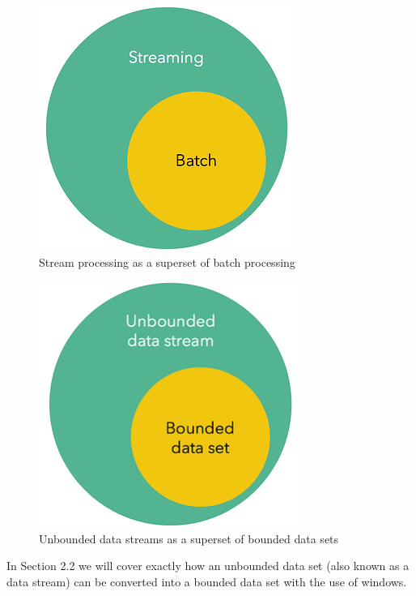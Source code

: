 \begin{figure}[!htb]
    \begin{center}
      \includegraphics[scale=0.5]{figures/streaming-subset-batch.png}
      \caption{Stream processing as a superset of batch processing}
      \label{fig:stream-superset}
    \end{center}
\end{figure}

\begin{figure}[!htb]
    \begin{center}
      \includegraphics[scale=0.5]{figures/unbounded-superset-bounded.png}
      \caption{Unbounded data streams as a superset of bounded data sets}
      \label{fig:unbounded-bounded-superset}
    \end{center}
\end{figure}


In Section 2.2 we will cover exactly how an unbounded data set (also known as a data stream) can be converted into a bounded data set with the use of windows.

